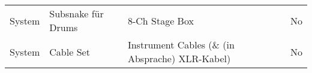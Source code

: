 {\begin{center}
\begin{tabular}{|l|l|p{4cm}|c|}
            \rowcolor{systemcolor} System         & Subsnake für Drums          & 8-Ch Stage Box                                      & No                      \\
            \rowcolor{systemcolor} System         & Cable Set                   & Instrument Cables (\& (in Absprache) XLR-Kabel)     & No                      \\
            \hline
        \end{tabular}
    \end{center}
}

